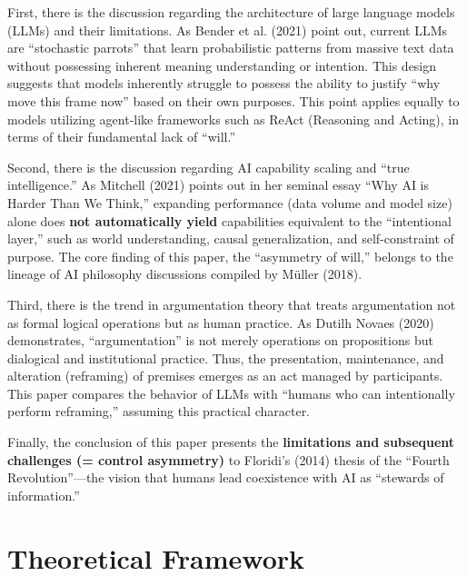 \documentclass[11pt, a4paper]{article}
\begin{document}
First, there is the discussion regarding the architecture of large language models (LLMs) and their limitations. As Bender et al. (2021) point out, current LLMs are ``stochastic parrots'' that learn probabilistic patterns from massive text data without possessing inherent meaning understanding or intention. This design suggests that models inherently struggle to possess the ability to justify ``why move this frame now'' based on their own purposes. This point applies equally to models utilizing agent-like frameworks such as ReAct (Reasoning and Acting), in terms of their fundamental lack of ``will.''

Second, there is the discussion regarding AI capability scaling and ``true intelligence.'' As Mitchell (2021) points out in her seminal essay ``Why AI is Harder Than We Think,'' expanding performance (data volume and model size) alone does \textbf{not automatically yield} capabilities equivalent to the ``intentional layer,'' such as world understanding, causal generalization, and self-constraint of purpose. The core finding of this paper, the ``asymmetry of will,'' belongs to the lineage of AI philosophy discussions compiled by Müller (2018).

Third, there is the trend in argumentation theory that treats argumentation not as formal logical operations but as human practice. As Dutilh Novaes (2020) demonstrates, ``argumentation'' is not merely operations on propositions but dialogical and institutional practice. Thus, the presentation, maintenance, and alteration (reframing) of premises emerges as an act managed by participants. This paper compares the behavior of LLMs with ``humans who can intentionally perform reframing,'' assuming this practical character.

Finally, the conclusion of this paper presents the \textbf{limitations and subsequent challenges (= control asymmetry)} to Floridi's (2014) thesis of the ``Fourth Revolution''—the vision that humans lead coexistence with AI as ``stewards of information.''

\section{Theoretical Framework}
\end{document}
